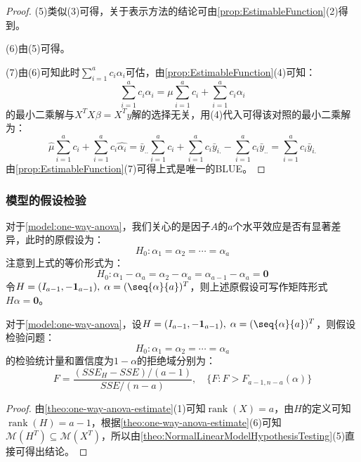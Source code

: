 \begin{proof}
	(5)类似(3)可得，关于表示方法的结论可由\cref{prop:EstimableFunction}(2)得到。\par
	(6)由(5)可得。\par
	(7)由(6)可知此时$\sum\limits_{i=1}^{a}c_i\alpha_i$可估，由\cref{prop:EstimableFunction}(4)可知：
	\begin{equation*}
		\sum_{i=1}^{a}c_i\alpha_i=\mu\sum_{i=1}^{a}c_i+\sum_{i=1}^{a}c_i\alpha_i
	\end{equation*}
	的最小二乘解与$X^TX\beta=X^Ty$解的选择无关，用(4)代入可得该对照的最小二乘解为：
	\begin{equation*}
		\hat{\mu}\sum_{i=1}^{a}c_i+\sum_{i=1}^{a}c_i\hat{\alpha_i}=	\bar{y}_{..}\sum_{i=1}^{a}c_i+\sum_{i=1}^{a}c_i\bar{y}_{i.}-\sum_{i=1}^{a}c_i\bar{y}_{..}=\sum_{i=1}^{a}c_i\bar{y}_{i.}
	\end{equation*}
	由\cref{prop:EstimableFunction}(7)可得上式是唯一的BLUE。
\end{proof}

\subsubsection{模型的假设检验}
\begin{note}
	对于\cref{model:one-way-anova}，我们关心的是因子$A$的$a$个水平效应是否有显著差异，此时的原假设为：
	\begin{equation*}
		H_0:\alpha_1=\alpha_2=\cdots=\alpha_a
	\end{equation*}
	注意到上式的等价形式为：
	\begin{equation*}
		H_0:\alpha_1-\alpha_a=\alpha_2-\alpha_a=\alpha_{a-1}-\alpha_a=\mathbf{0}
	\end{equation*}
	令$H=(I_{a-1},-\mathbf{1}_{a-1}),\;\alpha=(\seq{\alpha}{a})^T$，则上述原假设可写作矩阵形式$H\alpha=\mathbf{0}$。
\end{note}
\begin{theorem}\label{theo:AOVHypothesisTesting}
	对于\cref{model:one-way-anova}，设$H=(I_{a-1},-\mathbf{1}_{a-1}),\;\alpha=(\seq{\alpha}{a})^T$，则假设检验问题：
	\begin{equation*}
		H_0:\alpha_1=\alpha_2=\cdots=\alpha_a
	\end{equation*}
	的检验统计量和置信度为$1-\alpha$的拒绝域分别为：
	\begin{equation*}
		F=\frac{(SSE_H-SSE)/(a-1)}{SSE/(n-a)},\quad\{F:F>F_{a-1,n-a}(\alpha)\}
	\end{equation*}
\end{theorem}
\begin{proof}
	由\cref{theo:one-way-anova-estimate}(1)可知$\operatorname{rank}(X)=a$，由$H$的定义可知$\operatorname{rank}(H)=a-1$，根据\cref{theo:one-way-anova-estimate}(6)可知$\mathcal{M}(H^T)\subseteq\mathcal{M}(X^T)$，所以由\cref{theo:NormalLinearModelHypothesisTesting}(5)直接可得出结论。
\end{proof}
